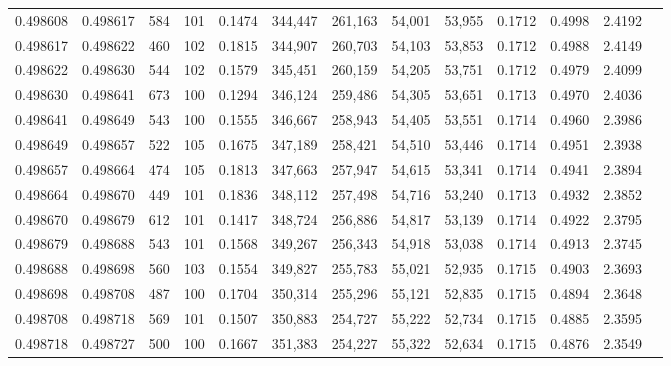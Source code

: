 \begin{tabular}{rrrrrrrrrrrrr}
0.498608 & 0.498617 &   584 & 101 &                                     0.1474 & 344,447 & 261,163 &  54,001 &  53,955 & 0.1712 & 0.4998 & 2.4192 \\
0.498617 & 0.498622 &   460 & 102 &                                     0.1815 & 344,907 & 260,703 &  54,103 &  53,853 & 0.1712 & 0.4988 & 2.4149 \\
0.498622 & 0.498630 &   544 & 102 &                                     0.1579 & 345,451 & 260,159 &  54,205 &  53,751 & 0.1712 & 0.4979 & 2.4099 \\
0.498630 & 0.498641 &   673 & 100 &                                     0.1294 & 346,124 & 259,486 &  54,305 &  53,651 & 0.1713 & 0.4970 & 2.4036 \\
0.498641 & 0.498649 &   543 & 100 &                                     0.1555 & 346,667 & 258,943 &  54,405 &  53,551 & 0.1714 & 0.4960 & 2.3986 \\
0.498649 & 0.498657 &   522 & 105 &                                     0.1675 & 347,189 & 258,421 &  54,510 &  53,446 & 0.1714 & 0.4951 & 2.3938 \\
0.498657 & 0.498664 &   474 & 105 &                                     0.1813 & 347,663 & 257,947 &  54,615 &  53,341 & 0.1714 & 0.4941 & 2.3894 \\
0.498664 & 0.498670 &   449 & 101 &                                     0.1836 & 348,112 & 257,498 &  54,716 &  53,240 & 0.1713 & 0.4932 & 2.3852 \\
0.498670 & 0.498679 &   612 & 101 &                                     0.1417 & 348,724 & 256,886 &  54,817 &  53,139 & 0.1714 & 0.4922 & 2.3795 \\
0.498679 & 0.498688 &   543 & 101 &                                     0.1568 & 349,267 & 256,343 &  54,918 &  53,038 & 0.1714 & 0.4913 & 2.3745 \\
0.498688 & 0.498698 &   560 & 103 &                                     0.1554 & 349,827 & 255,783 &  55,021 &  52,935 & 0.1715 & 0.4903 & 2.3693 \\
0.498698 & 0.498708 &   487 & 100 &                                     0.1704 & 350,314 & 255,296 &  55,121 &  52,835 & 0.1715 & 0.4894 & 2.3648 \\
0.498708 & 0.498718 &   569 & 101 &                                     0.1507 & 350,883 & 254,727 &  55,222 &  52,734 & 0.1715 & 0.4885 & 2.3595 \\
0.498718 & 0.498727 &   500 & 100 &                                     0.1667 & 351,383 & 254,227 &  55,322 &  52,634 & 0.1715 & 0.4876 & 2.3549 \\

\end{tabular}
